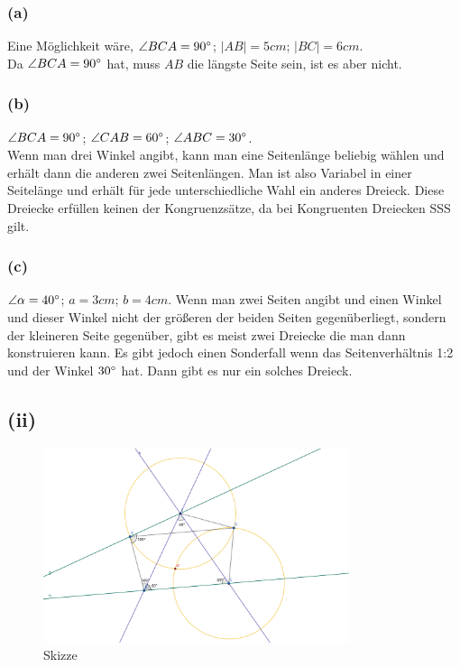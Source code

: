 \documentclass[12pt,a4paper]{article}
\begin{document}
\subsubsection*{(a)}
Eine Möglichkeit wäre, $\angle BCA = 90\degree$; $|AB| = 5cm$; $|BC| = 6cm$.\\
Da $\angle BCA = 90\degree$ hat, muss $AB$ die längste Seite sein, ist es aber nicht.

\subsubsection*{(b)}
$\angle BCA = 90\degree$; $\angle CAB = 60\degree$; $\angle ABC = 30\degree$. \\ 
Wenn man drei Winkel angibt, kann man eine Seitenlänge beliebig wählen und erhält dann die anderen zwei Seitenlängen. Man ist also Variabel in einer Seitelänge und erhält für jede unterschiedliche Wahl ein anderes Dreieck. Diese Dreiecke erfüllen keinen der Kongruenzsätze, da bei Kongruenten Dreiecken SSS gilt.

\subsubsection*{(c)}
$\angle \alpha = 40\degree$; $a = 3cm$; $b = 4cm$.
Wenn man zwei Seiten angibt und einen Winkel und dieser Winkel nicht der größeren der beiden Seiten gegenüberliegt, sondern der kleineren Seite gegenüber, gibt es meist zwei Dreiecke die man dann konstruieren kann. Es gibt jedoch einen Sonderfall wenn das Seitenverhältnis 1:2 und der Winkel $30\degree$ hat. Dann gibt es nur ein solches Dreieck.\\
\newpage
\subsection*{(ii)}
\begin{figure}[htbp]        
    \centering        
    \includegraphics[width=0.8\textwidth]{Blatt03_Aufgabe_8_ii.png}
    \caption{Skizze}
    \label{fig:mein_bild}
\end{figure}
\end{document}
